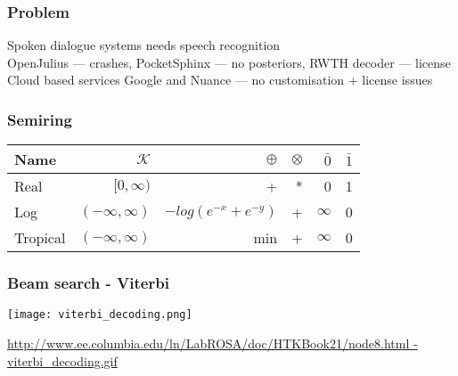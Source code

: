 \begin{frame}\frametitle{Problem} 
    Spoken dialogue systems needs speech recognition \\
    OpenJulius --- crashes, PocketSphinx --- no posteriors, RWTH decoder --- license \\
    Cloud based services Google and Nuance --- no customisation + license issues
\end{frame}

\begin{frame} \frametitle{Semiring}
\begin{tabular}{lrrrrr}
\hline
Name & $\mathcal{K}$ & $\oplus$ & $ \otimes$ & $\bar{0}$ & $\bar{1}$ \\ 
\hline
Real        & $[0,\infty)$        &  +                     &  * &  0        &  1  \\
Log         & $(-\infty, \infty)$ & $-log(e^{-x} + e^{-y})$ & + &  $\infty$ &  0  \\
Tropical    & $(-\infty, \infty)$ &  min                   &  + &  $\infty$ &  0  \\
\hline
\end{tabular}
\end{frame}

\begin{frame}\frametitle{Beam search - Viterbi}
    \begin{center}
        \texttt{[image: viterbi\_decoding.png]}
    \end{center}
    \tiny{\url{http://www.ee.columbia.edu/ln/LabROSA/doc/HTKBook21/node8.html  - viterbi_decoding.gif}}
\end{frame}

